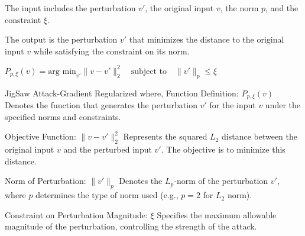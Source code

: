 The input includes the perturbation $v'$, the original input $v$, the norm $p$, and the constraint $\xi$.

The output is the perturbation $v'$ that minimizes the distance to the original input $v$ while satisfying the constraint on its norm.

$P_{p, \xi}(v) = \text{arg min}_{v'} \| v - v' \|_2^2 \quad \text{subject to} \quad \| v' \|_p \leq \xi$

JigSaw Attack-Gradient Regularized where,
Function Definition:
$P_{p, \xi}(v)$
Denotes the function that generates the perturbation $v'$ for the input $v$ under the specified norms and constraints.

Objective Function:
$\| v - v' \|_2^2$
Represents the squared $L_2$ distance between the original input $v$ and the perturbed input $v'$. The objective is to minimize this distance.

Norm of Perturbation:
$\| v' \|_p$
Denotes the $L_p$-norm of the perturbation $v'$, where $p$ determines the type of norm used (e.g., $p = 2$ for $L_2$ norm).

Constraint on Perturbation Magnitude:
$\xi$
Specifies the maximum allowable magnitude of the perturbation, controlling the strength of the attack.
